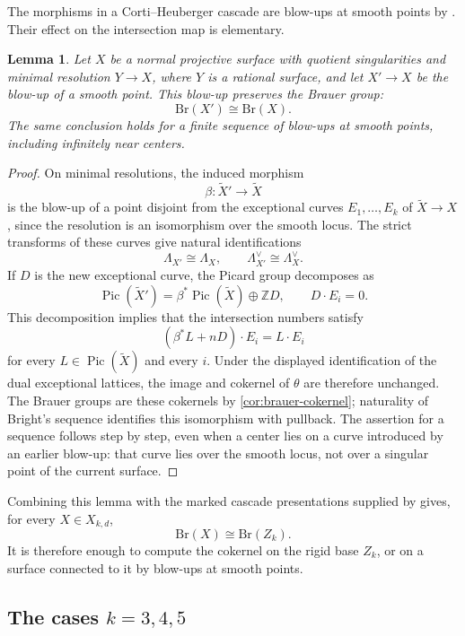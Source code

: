 \documentclass[11pt]{article}
\theoremstyle{plain}
\newtheorem{lemma}[lemma]{Lemma}
\theoremstyle{definition}
\theoremstyle{remark}
\newcommand{\Z}{\mathbb Z}
\newcommand{\Pic}{\operatorname{Pic}}
\newcommand{\Br}{\mathrm{Br}}
\begin{document}
The morphisms in a Corti--Heuberger cascade are blow-ups at smooth points by
\cite[Corollary~8]{Corti2016}. Their effect on the intersection map
is elementary.

\begin{lemma}\label{lem:brauer-cascade-invariance}
Let \(X\) be a normal projective surface with quotient singularities and
minimal resolution \(Y\to X\), where \(Y\) is a rational surface, and let \(X'\to X\) be the blow-up of a
smooth point. This blow-up preserves the Brauer group:
\[
\Br(X')\cong\Br(X).
\]
The same conclusion holds for a finite sequence of blow-ups at smooth points,
including infinitely near centers.
\end{lemma}

\begin{proof}
On minimal resolutions, the induced morphism
\[
\beta:\widetilde X'\longrightarrow\widetilde X
\]
is the blow-up of a point disjoint from the exceptional curves
\(E_1,\dots,E_k\) of \(\widetilde X\to X\), since the resolution is an
isomorphism over the smooth locus. The strict
transforms of these curves give natural identifications
\[
\Lambda_{X'}\cong\Lambda_X,
\qquad
\Lambda_{X'}^\vee\cong\Lambda_X^\vee.
\]
If \(D\) is the new exceptional curve, the Picard group decomposes as
\[
\Pic(\widetilde X')
=
\beta^*\Pic(\widetilde X)\oplus\Z D,
\qquad
D\cdot E_i=0.
\]
This decomposition implies that the intersection numbers satisfy
\[
(\beta^*L+nD)\cdot E_i=L\cdot E_i
\]
for every \(L\in\Pic(\widetilde X)\) and every \(i\). Under the displayed identification of the dual exceptional
lattices, the image and cokernel of \(\theta\) are therefore unchanged.
The Brauer groups are these cokernels by \cref{cor:brauer-cokernel};
naturality of Bright's sequence identifies this isomorphism with pullback.
The assertion for a sequence follows step by step, even when a center
lies on a curve introduced by an earlier blow-up: that curve lies over
the smooth locus, not over a singular point of the current surface.
\end{proof}

Combining this lemma with the marked cascade presentations supplied by
\cite[Corollary~8]{Corti2016} gives, for every \(X\in X_{k,d}\),
\begin{equation}\label{eq:brauer-cascade}
\Br(X)\cong\Br(Z_k).
\end{equation}
It is therefore enough to compute the cokernel on the rigid base
\(Z_k\), or on a surface connected to it by blow-ups at smooth points.

\subsection{\texorpdfstring{The cases \(k=3,4,5\)}{The cases k=3,4,5}}
\label{app:brauer-unobstructed}
\end{document}
